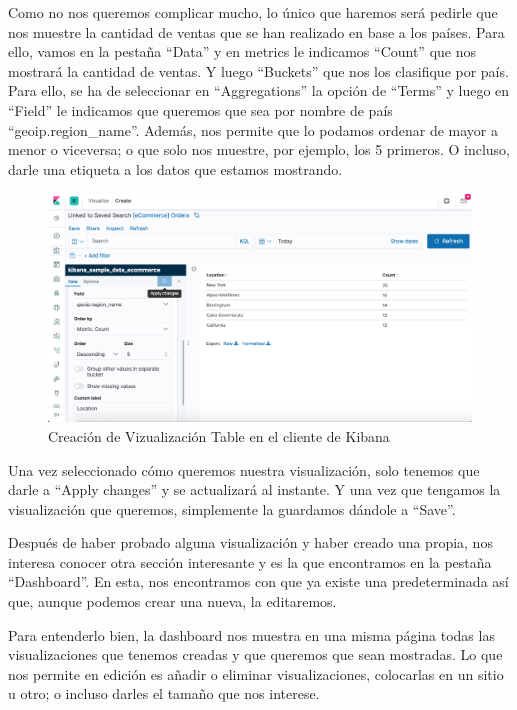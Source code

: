 \documentclass[a4paper, 12pt]{book}
\begin{document}
Como no nos queremos complicar mucho, lo único que haremos será pedirle que nos muestre la cantidad de ventas que se han realizado en base a los países. Para ello, vamos en la pestaña “Data” y en metrics le indicamos “Count” que nos mostrará la cantidad de ventas. Y luego “Buckets” que nos los clasifique por país. Para ello, se ha de seleccionar en “Aggregations” la opción de “Terms” y luego en “Field” le indicamos que queremos que sea por nombre de país “geoip.region\_name”. Además, nos permite que lo podamos ordenar de mayor a menor o viceversa; o que solo nos muestre, por ejemplo, los 5 primeros. O incluso, darle una etiqueta a los datos que estamos mostrando.

\begin{figure}[H]
  \centering
  \includegraphics[width=12cm, keepaspectratio]{img/development/kibana-table-editor.png}
  \caption{Creación de Vizualización Table en el cliente de Kibana}
  \label{fig:kibanatable}
\end{figure}

Una vez seleccionado cómo queremos nuestra visualización, solo tenemos que darle a “Apply changes” y se actualizará al instante. Y una vez que tengamos la visualización que queremos, simplemente la guardamos dándole a “Save”.

Después de haber probado alguna visualización y haber creado una propia, nos interesa conocer otra sección interesante y es la que encontramos en la pestaña “Dashboard”. En esta, nos encontramos con que ya existe una predeterminada así que, aunque podemos crear una nueva, la editaremos.

Para entenderlo bien, la dashboard nos muestra en una misma página todas las visualizaciones que tenemos creadas y que queremos que sean mostradas. Lo que nos permite en edición es añadir o eliminar visualizaciones, colocarlas en un sitio u otro; o incluso darles el tamaño que nos interese.
\end{document}
